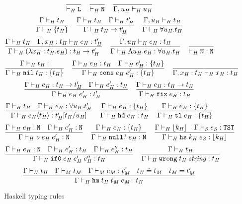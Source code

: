 \begin{figure}[p]
\[
\frac
{}
{ \vdash_{\mathit{H}} \mathtt{L}}
\quad
\frac
{}
{ \vdash_{\mathit{H}} \mathtt{N}}
\quad
\frac
{}
{\Gamma , u_{\mathit{H}} \vdash_{\mathit{H}} u_{\mathit{H}}}
\]
\[
\frac
{\Gamma \vdash_{\mathit{H}} t_{\mathit{H}}}
{\Gamma \vdash_{\mathit{H}} \lbrace t_{\mathit{H}} \rbrace}
\quad
\frac
{\Gamma \vdash_{\mathit{H}} t_{\mathit{H}} \quad \Gamma \vdash_{\mathit{H}} t_{\mathit{H}}'}
{\Gamma \vdash_{\mathit{H}} t_{\mathit{H}} \rightarrow t_{\mathit{H}}'}
\quad
\frac
{\Gamma, u_{\mathit{H}} \vdash_{\mathit{H}} t_{\mathit{H}}}
{\Gamma \vdash_{\mathit{H}} \forall u_{\mathit{H}} . t_{\mathit{H}}}
\]
\bigskip
\[
\frac
{\Gamma \vdash_{\mathit{H}} t_{\mathit{H}} \quad \Gamma , x_{\mathit{H}} : t_{\mathit{H}} \vdash_{\mathit{H}} e_{\mathit{H}} : t_{\mathit{H}}'}
{\Gamma \vdash_{\mathit{H}} (\lambda x_{\mathit{H}} : t_{\mathit{H}} . e_{\mathit{H}}) : t_{\mathit{H}} \rightarrow t_{\mathit{H}}'}
\quad
\frac
{\Gamma , u_{\mathit{H}} \vdash_{\mathit{H}} e_{\mathit{H}} : t_{\mathit{H}}}
{\Gamma \vdash_{\mathit{H}} \Lambda u_{\mathit{H}} . e_{\mathit{H}} : \forall u_{\mathit{H}} . t_{\mathit{H}}}
\quad
\frac
{}
{ \vdash_{\mathit{H}} \overline{n} : \mathtt{N}}
\]
\[
\frac
{\judeh{\env}{\vartyh}}
{\judeh{\env}{\expnils{\vartyh}}{\tylist{\vartyh}}}
\quad
\frac
{\judeh{\env}{\first{\varexph}}{\vartyh} \quad \judeh{\env}{\second{\varexph}}{\tylist{\vartyh}}}
{\judeh{\env}{\expcons{\first{\varexph}}{\second{\varexph}}}{\tylist{\vartyh}}}
\quad
\frac
{}
{\judeh{\envexte{\varvarh}{\vartyh}}{\varvarh}{\vartyh}}
\]
\[
\frac
{\Gamma \vdash_{\mathit{H}} e_{\mathit{H}} : t_{\mathit{H}} \rightarrow t_{\mathit{H}}' \quad \Gamma \vdash_{\mathit{H}} e_{\mathit{H}}' : t_{\mathit{H}}}
{\Gamma\vdash_{\mathit{H}}e_{\mathit{H}} \; e_{\mathit{H}}':t_{\mathit{H}}'}
\quad
\frac
{\Gamma \vdash_{\mathit{H}} e_{\mathit{H}} : t_{\mathit{H}} \rightarrow t_{\mathit{H}}}
{\Gamma \vdash_{\mathit{H}} \mathtt{fix} \; e_{\mathit{H}} : t_{\mathit{H}}}
\]
\[
\frac
{\Gamma \vdash_{\mathit{H}} t_{\mathit{H}} \quad \Gamma \vdash_{\mathit{H}} e_{\mathit{H}} : \forall u_{\mathit{H}} . t_{\mathit{H}}'}
{\Gamma \vdash_{\mathit{H}} e_{\mathit{H}} \langle t_{\mathit{H}} \rangle : t_{\mathit{H}}'[t_{\mathit{H}}/u_{\mathit{H}}]}
\quad
\frac
{\Gamma \vdash_{\mathit{H}} e_{\mathit{H}} : \lbrace t_{\mathit{H}} \rbrace}
{\Gamma \vdash_{\mathit{H}} \mathtt{hd} \; e_{\mathit{H}} : t_{\mathit{H}}}
\quad
\frac
{\Gamma \vdash_{\mathit{H}} e_{\mathit{H}} : \lbrace t_{\mathit{H}} \rbrace}
{\Gamma \vdash_{\mathit{H}} \mathtt{tl} \; e_{\mathit{H}} : \lbrace t_{\mathit{H}} \rbrace}
\]
\[
\frac
{\Gamma \vdash_{\mathit{H}} e_{\mathit{H}} : \mathtt{N} \quad \Gamma \vdash_{\mathit{H}} e_{\mathit{H}}' : \mathtt{N}}
{\Gamma \vdash_{\mathit{H}} \mathit{o} \; e_{\mathit{H}} \; e_{\mathit{H}}' : \mathtt{N}}
\quad
\frac
{\Gamma \vdash_{\mathit{H}} e_{\mathit{H}} : \lbrace t_{\mathit{H}} \rbrace}
{\Gamma \vdash_{\mathit{H}} \mathtt{null?} \; e_{\mathit{H}} : \mathtt{N}}
\quad
\frac
{\Gamma \vdash_{\mathit{H}} \lfloor k_{\mathit{H}} \rfloor \quad \Gamma \vdash_{\mathit{S}} e_{\mathit{S}} : \mathtt{TST}}
{\Gamma \vdash_{\mathit{H}} \mathtt{hs} \; k_{\mathit{H}} \; e_{\mathit{S}} : \lfloor k_{\mathit{H}} \rfloor}
\]
\[
\frac
{\Gamma \vdash_{\mathit{H}} e_{\mathit{H}} : \mathtt{N} \quad \Gamma \vdash_{\mathit{H}} e_{\mathit{H}}' : t_{\mathit{H}} \quad \Gamma \vdash_{\mathit{H}} e_{\mathit{H}}'' : t_{\mathit{H}}}
{\Gamma \vdash_{\mathit{H}} \mathtt{if0} \; e_{\mathit{H}} \; e_{\mathit{H}}' \; e_{\mathit{H}}'' : t_{\mathit{H}}}
\quad
\frac
{\Gamma \vdash_{\mathit{H}} t_{\mathit{H}}}
{\Gamma \vdash_{\mathit{H}} \mathtt{wrong} \; t_{\mathit{H}} \; \mathit{string} : t_{\mathit{H}}}
\]
\[
\frac
{\Gamma \vdash_{\mathit{H}} t_{\mathit{H}} \quad \Gamma \vdash_{\mathit{M}} t_{\mathit{M}} \quad \Gamma \vdash_{\mathit{M}} e_{\mathit{M}} : t_{\mathit{M}}' \quad t_{\mathit{H}} \doteq t_{\mathit{M}} \quad t_{\mathit{M}} = t_{\mathit{M}}'}
{\Gamma \vdash_{\mathit{H}} \mathtt{hm} \; t_{\mathit{H}} \; t_{\mathit{M}} \; e_{\mathit{M}} : t_{\mathit{H}}}
\]
\caption{Haskell typing rules}
\label{htr}
\end{figure}
